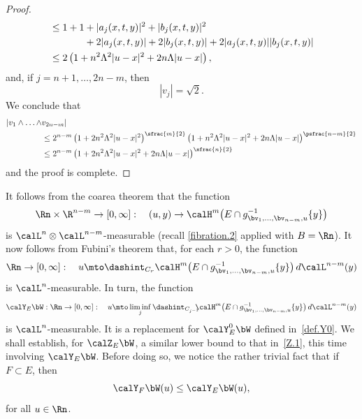 \begin{proof}
\begin{equation*}
\begin{split}
& \leq 1 + 1 + |a_j(x,t,y)|^2 + |b_j(x,t,y)|^2 \\
& \hspace*{1.25cm}+ 2|a_j(x,t,y)| + 2 |b_j(x,t,y)| + 2 |a_j(x,t,y)||b_j(x,t,y)| \\
& \leq 2 \left(1 + n^2 \Lambda^2 |u-x|^2 + 2n\Lambda |u-x| \right),
\end{split}
\end{equation*}
and, if $j=n+1,\ldots,2n-m$, then
\begin{equation*}
\left| v_j \right| = \sqrt{2}.
\end{equation*}
We conclude that
\begin{align*}
|v_1\wedge \ldots \wedge &v_{2n-m} |\\
&\leq 2^{n-m}\left(1 + 2n^2 \Lambda^2|u-x|^2\right)^{\sfrac{m}{2}}\left(1 + n^2 \Lambda^2 |u-x|^2+ 2n\Lambda |u-x| \right)^{\psfrac{n-m}{2}} \\
&\leq 2^{n-m}\left(1 + 2n^2 \Lambda^2|u-x|^2+2n\Lambda |u-x| \right)^{\sfrac{n}{2}}
\end{align*}
and the proof is complete.
\end{proof}

\begin{Empty}
\label{def.Y}
It follows from the coarea theorem that the function
\begin{equation*}
\Rn \times \R^{n-m} \to [0,\infty]:\quad (u,y) \to \calH^m \bigl(E \cap g_{\bv_1,\ldots,\bv_{n-m},u}^{-1} \{y\}\bigr)
\end{equation*}
is $\calL^n \otimes \calL^{n-m}$-measurable (recall \ref{fibration.2} applied with $B = \Rn$).
It now follows from Fubini's theorem that, for each $r > 0$, the function
\begin{equation*}
\Rn \to [0,\infty]:\quad u \mto \dashint_{C_r} \calH^m \bigl(E \cap g_{\bv_1,\ldots,\bv_{n-m},u}^{-1} \{y\}\bigr) \,d\calL^{n-m}(y)
\end{equation*}
is $\calL^n$-measurable.
In turn, the function
\begin{equation*}
\calY_E \bW: \Rn \to [0,\infty]:\quad u \mto \liminf_j \dashint_{C_{j^{-1}}}\hspace*{-2mm} \calH^m \bigl(E \cap g_{\bv_1,\ldots,\bv_{n-m},u}^{-1} \{y\}\bigr) \,d\calL^{n-m}(y)
\end{equation*}
is $\calL^n$-measurable.
It is a replacement for $\calY^0_E \bW$ defined in~\ref{def.Y0}.
We shall establish, for $\calZ_E \bW$, a similar lower bound to that in~\ref{Z.1}, this time involving $\calY_E \bW$.
Before doing so, we notice the rather trivial fact that if $F \subset E$, then
\begin{equation*}
\calY_F \bW(u) \leq \calY_E \bW(u),
\end{equation*}
for all $u \in \Rn$.
\end{Empty}


